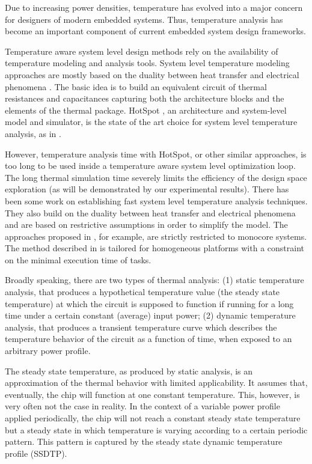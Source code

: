 Due to increasing power densities, temperature has evolved into a major concern for designers of modern embedded systems. Thus, temperature analysis has become an important component of current embedded system design frameworks.

Temperature aware system level design methods rely on the availability of temperature modeling and analysis tools. System level temperature modeling approaches are mostly based on the duality between heat transfer and electrical phenomena \cite{kreith2000}. The basic idea is to build an equivalent circuit of thermal resistances and capacitances capturing both the architecture blocks and the elements of the thermal package. HotSpot \cite{huang2003}, an architecture and system-level model and simulator, is the state of the art choice for system level temperature analysis, as in \cite{lu2004, srinivasan2004, liao2005, coskun2006, liu2007, huang2009, xiang2010, thiele2011}.

However, temperature analysis time with HotSpot, or other similar approaches, is too long to be used inside a temperature aware system level optimization loop. The long thermal simulation time severely limits the efficiency of the design space exploration (as will be demonstrated by our experimental results). There has been some work on establishing fast system level temperature analysis techniques. They also build on the duality between heat transfer and electrical phenomena and are based on restrictive assumptions in order to simplify the model. The approaches proposed in \cite{thiele2011, bao2010}, for example, are strictly restricted to monocore systems. The method described in \cite{rao2009} is tailored for homogeneous platforms with a constraint on the minimal execution time of tasks.

Broadly speaking, there are two types of thermal analysis: (1) static temperature analysis, that produces a hypothetical temperature value (the steady state temperature) at which the circuit is supposed to function if running for a long time under a certain constant (average) input power; (2) dynamic temperature analysis, that produces a transient temperature curve which describes the temperature behavior of the circuit as a function of time, when exposed to an arbitrary power profile.

The steady state temperature, as produced by static analysis, is an approximation of the thermal behavior with limited applicability. It assumes that, eventually, the chip will function at one constant temperature.  This, however, is very often not the case in reality. In the context of a variable power profile applied periodically, the chip will not reach a constant steady state temperature but a steady state in which temperature is varying according to a certain periodic pattern. This pattern is captured by the steady state dynamic temperature profile (SSDTP).

